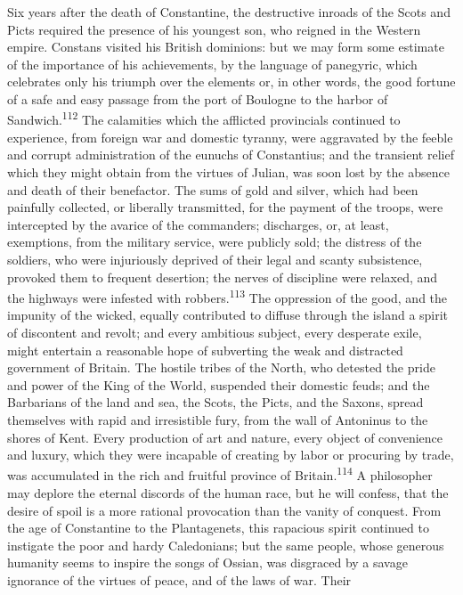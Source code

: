 {{{{{{{{{{{{{{{{{{{{{{{{{{{{{{{{{{{{{{{{{{{{{{{{{{{{{{{{{{{{{{{{{{{{{{{{{{{{{{{{{{{{{{{{{{{{{{{{{{{{{{{{{{{{{{{{{{{{{{{{{{Six years after the death of Constantine, the destructive inroads
of the Scots and Picts required the presence of his youngest son,
who reigned in the Western empire. Constans visited his British
dominions: but we may form some estimate of the importance of his
achievements, by the language of panegyric, which celebrates only
his triumph over the elements or, in other words, the good
fortune of a safe and easy passage from the port of Boulogne to
the harbor of Sandwich.\textsuperscript{112} The calamities which the afflicted
provincials continued to experience, from foreign war and
domestic tyranny, were aggravated by the feeble and corrupt
administration of the eunuchs of Constantius; and the transient
relief which they might obtain from the virtues of Julian, was
soon lost by the absence and death of their benefactor. The sums
of gold and silver, which had been painfully collected, or
liberally transmitted, for the payment of the troops, were
intercepted by the avarice of the commanders; discharges, or, at
least, exemptions, from the military service, were publicly sold;
the distress of the soldiers, who were injuriously deprived of
their legal and scanty subsistence, provoked them to frequent
desertion; the nerves of discipline were relaxed, and the
highways were infested with robbers.\textsuperscript{113} The oppression of the
good, and the impunity of the wicked, equally contributed to
diffuse through the island a spirit of discontent and revolt; and
every ambitious subject, every desperate exile, might entertain a
reasonable hope of subverting the weak and distracted government
of Britain. The hostile tribes of the North, who detested the
pride and power of the King of the World, suspended their
domestic feuds; and the Barbarians of the land and sea, the
Scots, the Picts, and the Saxons, spread themselves with rapid
and irresistible fury, from the wall of Antoninus to the shores
of Kent. Every production of art and nature, every object of
convenience and luxury, which they were incapable of creating by
labor or procuring by trade, was accumulated in the rich and
fruitful province of Britain.\textsuperscript{114} A philosopher may deplore the
eternal discords of the human race, but he will confess, that the
desire of spoil is a more rational provocation than the vanity of
conquest. From the age of Constantine to the Plantagenets, this
rapacious spirit continued to instigate the poor and hardy
Caledonians; but the same people, whose generous humanity seems
to inspire the songs of Ossian, was disgraced by a savage
ignorance of the virtues of peace, and of the laws of war. Their
}}}}}}}}}}}}}}}}}}}}}}}}}}}}}}}}}}}}}}}}}}}}}}}}}}}}}}}}}}}}}}}}}}}}}}}}}}}}}}}}}}}}}}}}}}}}}}}}}}}}}}}}}}}}}}}}}}}}}}}}}}
